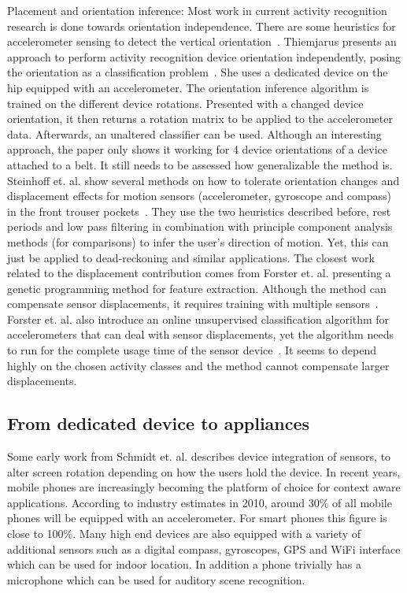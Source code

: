 \begin{description}
 \item{Placement and orientation inference:} 
 Most work in current
 activity recognition research is done towards orientation
 independence. There are some heuristics for accelerometer sensing to detect the vertical orientation~\cite{Mizell2003using,kern2002wearable}.
 Thiemjarus presents an approach to perform activity
 recognition device orientation independently, posing the orientation
 as a classification problem~\cite{bsn1}. She uses a dedicated device
 on the hip equipped with an accelerometer. The orientation inference 
 algorithm is trained on the different device rotations. Presented with
 a changed device orientation, it then returns a rotation matrix to
 be applied to the accelerometer data. Afterwards, an unaltered classifier
 can be used. Although an interesting
 approach, the paper only shows it working for 4 device
 orientations of a device attached to a belt. It still
 needs to be assessed how generalizable the method is. 
 Steinhoff et. al. show several methods on how to tolerate orientation
 changes and displacement effects for motion sensors (accelerometer, gyroscope and compass) in the front trouser
 pockets~\cite{deadreckoning}. They use the two heuristics described before, rest periods
 and low pass filtering in combination with principle component analysis methods (for
 comparisons) to infer the user's direction of motion. Yet, this can just be applied to
 dead-reckoning and similar applications. The closest work related to the
 displacement contribution comes from Forster et. al. presenting a
 genetic programming method for feature extraction. Although the
 method can compensate sensor displacements, it requires training
 with multiple sensors~\cite{Forster1}. Forster et. al. also introduce
 an online unsupervised classification algorithm for
 accelerometers that can deal with sensor displacements, yet the
 algorithm needs to run for the complete usage time of the sensor
 device~\cite{Forster2}. It seems to depend highly on the chosen
 activity classes and the method cannot compensate larger displacements. 
\end{description}


\subsection{From dedicated device to appliances}

Some early work from Schmidt et. al. describes device integration of sensors, to alter screen rotation
depending on how the users hold the device. In recent years, 
mobile phones are increasingly becoming the platform
of choice for context aware applications. According to industry
estimates in 2010, around 30\% of all mobile phones will be equipped
with an accelerometer. For smart phones this figure is close to
100\%. Many high end devices are also equipped with a variety of
additional sensors such as a digital compass, gyroscopes, GPS and WiFi
interface which can be used for indoor location. In addition a phone
trivially has a microphone which can be used for auditory scene
recognition. 


